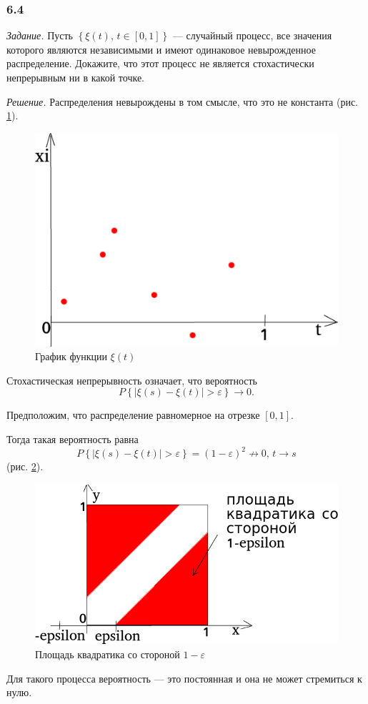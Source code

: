\subsubsection*{6.4}

\textit{Задание.}
Пусть $ \left\{ \xi \left( t \right), \, t \in \left[ 0, 1 \right] \right\} $ ---
случайный процесс, все значения которого являются независимыми и имеют одинаковое невырожденное
распределение.
Докажите, что этот процесс не является стохастически непрерывным ни в какой точке.

\textit{Решение.}
Распределения невырождены в том смысле, что это не константа (рис. \ref{fig:64}).

\begin{figure}[h!]
  \centering
  \includegraphics[width=.4\textwidth]{./pictures/6_4.png}
  \caption{График функции $ \xi \left( t \right) $}
  \label{fig:64}
\end{figure}

Стохастическая непрерывность означает, что вероятность
$$P \left\{ \left| \xi \left( s \right) - \xi \left( t \right) \right| > \varepsilon \right\} \to
  0.$$

Предположим, что распределение равномерное на отрезке $ \left[ 0, 1 \right] $.

Тогда такая вероятность равна
$$P \left\{ \left| \xi \left( s \right) - \xi \left( t \right) \right| > \varepsilon \right\} =
  \left( 1 - \varepsilon \right)^2 \not \to
  0, \,
  t \to s$$
(рис. \ref{fig:641}).

\begin{figure}[h!]
  \centering
  \includegraphics[width=.4\textwidth]{./pictures/6_4_1.png}
  \caption{Площадь квадратика со стороной $1 - \varepsilon$}
  \label{fig:641}
\end{figure}

Для такого процесса вероятность --- это постоянная и она не может стремиться к нулю.

